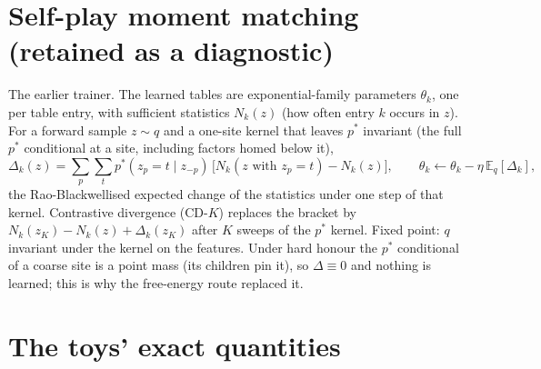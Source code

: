 \documentclass[11pt]{article}
\newcommand{\1}{\mathds{1}}
\newcommand{\pstar}{p^{*}}
\begin{document}
\section{Self-play moment matching (retained as a diagnostic)}

The earlier trainer. The learned tables are exponential-family parameters $\theta_k$, one per
table entry, with sufficient statistics $N_k(z)$ (how often entry $k$ occurs in $z$). For a
forward sample $z \sim q$ and a one-site kernel that leaves $\pstar$ invariant (the full
$\pstar$ conditional at a site, including factors homed below it),
\begin{equation}
  \Delta_k(z) = \sum_{p} \sum_{t} \pstar(z_p = t \mid z_{-p})\,\big[N_k(z \text{ with } z_p = t) - N_k(z)\big],
  \qquad
  \theta_k \leftarrow \theta_k - \eta\,\mathbb{E}_{q}[\Delta_k] ,
\end{equation}
the Rao-Blackwellised expected change of the statistics under one step of that kernel.
Contrastive divergence (CD-$K$) replaces the bracket by $N_k(z_K) - N_k(z) + \Delta_k(z_K)$
after $K$ sweeps of the $\pstar$ kernel. Fixed point: $q$ invariant under the kernel on the
features. Under hard honour the $\pstar$ conditional of a coarse site is a point mass (its
children pin it), so $\Delta \equiv 0$ and nothing is learned; this is why the free-energy route
replaced it.

\section{The toys' exact quantities}
\end{document}
